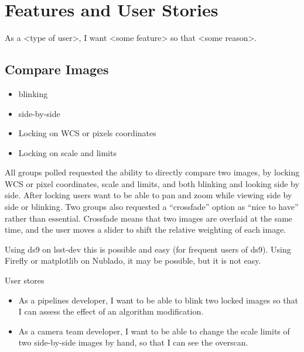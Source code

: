 \section{Features and User Stories}
\label{sec:features}

As a <type of user>, I want <some feature> so that <some reason>. 

\subsection{Compare Images}
\begin{itemize}
\item{blinking}
\item{side-by-side}
\item{Locking on WCS or pixels coordinates}
\item{Locking on scale and limits}
\end{itemize}

All groups polled requested the ability to directly compare two images, by locking WCS or pixel coordinates, scale and limits, and both blinking and looking side by side.
After locking users want to be able to pan and zoom while viewing side by side or blinking.
Two groups also requested a ``crossfade'' option as ``nice to have'' rather than essential.
Crossfade means that two images are overlaid at the same time, and the user moves a slider to shift the relative weighting of each image.

Using ds9 on lsst-dev this is possible and easy (for frequent users of ds9).
Using Firefly or matplotlib on Nublado, it may be possible, but it is not easy.

User stores
\begin{itemize}
\item{As a pipelines developer,  I want to be able to blink two locked images so that I can assess the effect of an algorithm modification.}
\item{As a camera team developer,  I want to be able to change the scale limits of two side-by-side images by hand, so that I can see the overscan.}
\end{itemize}

